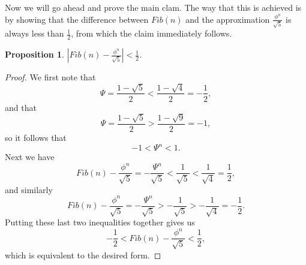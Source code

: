 \documentclass{article}
\newtheorem{proposition}{Proposition}
\begin{document}

Now we will go ahead and prove the main clam.  The way that this is achieved is
by showing that the difference between $\mathit{Fib}(n)$ and the approximation
$\frac{ \phi^n }{ \sqrt{5} }$ is always less than $\frac{1}{2}$, from which the
claim immediately follows.

\begin{proposition}
  $\displaystyle \left| \mathit{Fib}(n) - \frac{ \phi^n }{ \sqrt{5} } \right| < \frac{1}{2}$.
\end{proposition}

\begin{proof}
  We first note that
  \begin{equation*}
    \Psi = \frac{ 1 - \sqrt{5} }{ 2 } < \frac{ 1 - \sqrt{4} }{ 2 } = - \frac{1}{2},
  \end{equation*}
  and that
  \begin{equation*}
    \Psi = \frac{ 1 - \sqrt{5} }{ 2 } > \frac{ 1 - \sqrt{9} }{ 2 } = -1,
  \end{equation*}
  so it follows that
  \begin{equation*}
    -1 < \Psi^n < 1.
  \end{equation*}
  Next we have
  \begin{equation*}
    \mathit{Fib}(n) - \frac{ \phi^n }{ \sqrt{5} }
    = - \frac{ \Psi^n }{ \sqrt{5} }
    < \frac{ 1 }{ \sqrt{5} }
    < \frac{ 1 }{ \sqrt{4} }
    = \frac{ 1 }{ 2 },
  \end{equation*}
  and similarly
  \begin{equation*}
    \mathit{Fib}(n) - \frac{ \phi^n }{ \sqrt{5} }
    = - \frac{ \Psi^n }{ \sqrt{5} }
    > - \frac{ 1 }{ \sqrt{5} }
    > - \frac{ 1 }{ \sqrt{4} }
    = - \frac{ 1 }{ 2 }.
  \end{equation*}
  Putting these last two inequalities together gives us
  \begin{equation*}
    -\frac{1}{2} < \mathit{Fib}(n) - \frac{ \phi^n }{ \sqrt{5} } < \frac{1}{2},
  \end{equation*}
  which is equivalent to the desired form.
\end{proof}
\end{document}
